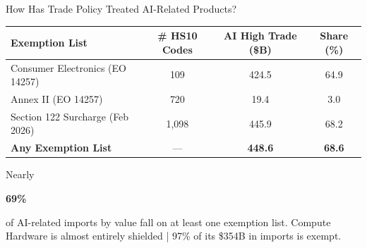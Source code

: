 \documentclass[10pt,pdftex,aspectratio=169]{beamer}
\theoremstyle{definition}
\begin{document}
\begin{frame}[t]{How Has Trade Policy Treated AI-Related Products?}
\begin{table}[t]
\centering
\setlength{\tabcolsep}{1.5mm}
\renewcommand{\arraystretch}{1.25}
\begin{tabular}{lccc}
\toprule
Exemption List & \# HS10 Codes & AI High Trade (\$B) & Share (\%) \\
\midrule
Consumer Electronics (EO 14257) & 109 & 424.5 & 64.9 \\
Annex II (EO 14257) & 720 & 19.4 & 3.0 \\
Section 122 Surcharge (Feb 2026) & 1,098 & 445.9 & 68.2 \\
\midrule
\textbf{Any Exemption List} & --- & \textbf{448.6} & \textbf{68.6} \\
\bottomrule
\end{tabular}
\end{table}
\medskip
Nearly \begin{alert}{\textbf{69\%}}\end{alert} of AI-related imports by value fall on at least one exemption list. Compute Hardware is almost entirely shielded | 97\% of its \$354B in imports is exempt.
\end{frame}


\end{document}
